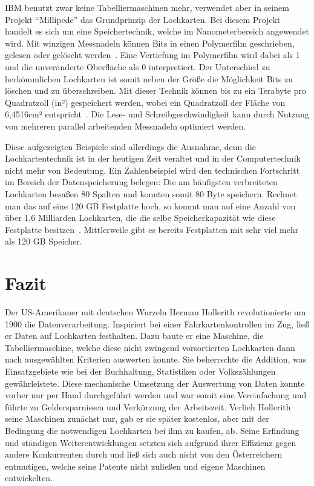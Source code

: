 \documentclass[parskip=half]{scrartcl}
\begin{document}
IBM benutzt zwar keine Tabelliermaschinen mehr, verwendet aber in seinem
Projekt \enquote{Millipede} das Grundprinzip der Lochkarten. Bei diesem Projekt
handelt es sich um eine Speichertechnik, welche im Nanometerbereich angewendet
wird.  Mit winzigen Messnadeln können Bits in einen Polymerfilm geschrieben,
gelesen oder gelöscht werden~\cite{binnig}. Eine Vertiefung im
Polymerfilm wird dabei als 1 und die unveränderte Oberfläche als 0
interpretiert. Der Unterschied zu herkömmlichen Lochkarten ist somit neben der
Größe die Möglichkeit Bits zu löschen und zu überschreiben. Mit dieser Technik
können bis zu ein Terabyte pro Quadratzoll (in²) gespeichert werden, wobei ein
Quadratzoll der Fläche von 6,4516cm² entspricht~\cite{binnig}. Die
Lese- und Schreibgeschwindigkeit kann durch Nutzung von mehreren parallel
arbeitenden Messnadeln optimiert werden.

Diese aufgezeigten Beispiele sind allerdings die Ausnahme, denn die
Lochkartentechnik ist in der heutigen Zeit veraltet und in der Computertechnik
nicht mehr von Bedeutung. Ein Zahlenbeispiel wird den technischen Fortschritt
im Bereich der Datenspeicherung belegen: Die am häufigsten verbreiteten
Lochkarten besaßen 80 Spalten und konnten somit 80 Byte speichern. Rechnet man
das auf eine 120 GB Festplatte hoch, so kommt man auf eine Anzahl von über 1,6
Milliarden Lochkarten, die die selbe Speicherkapazität wie diese Festplatte
besitzen~\cite{roeltgen}. Mittlerweile gibt es bereits Festplatten mit sehr
viel mehr als 120 GB Speicher.

\section{Fazit}

Der US-Amerikaner mit deutschen Wurzeln Herman Hollerith revolutionierte um 1900 die Datenverarbeitung. 
Inspiriert bei einer Fahrkartenkontrollen im Zug, ließ er Daten auf Lochkarten festhalten. Dazu baute er eine Maschine, die Tabelliermaschine, welche diese nicht zwingend vorsortierten Lochkarten dann nach ausgewählten Kriterien auswerten konnte. 
Sie beherrschte die Addition, was Einsatzgebiete wie bei der Buchhaltung, Statistiken oder Volkszählungen gewährleistete. Diese mechanische 
Umsetzung der Auswertung von Daten konnte vorher nur per Hand durchgeführt werden und war somit eine Vereinfachung und führte zu Geldersparnissen und Verkürzung der Arbeitszeit.
Verlieh Hollerith seine Maschinen zunächst nur, gab er sie später kostenlos, aber mit der Bedingung die notwendigen Lochkarten bei ihm zu kaufen, ab.
Seine Erfindung und ständigen Weiterentwicklungen setzten sich aufgrund ihrer Effizienz gegen andere Konkurrenten durch und 
ließ sich auch nicht von den Österreichern entmutigen, welche seine Patente nicht zuließen und eigene Maschinen entwickelten.
\end{document}
